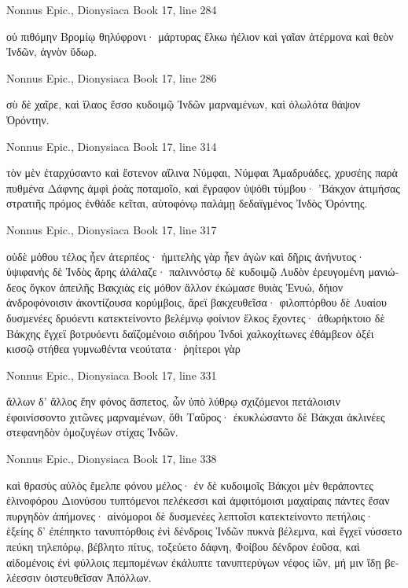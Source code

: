 \documentclass[12pt,letterpaper,twoside,final]{memoir}
\begin{document}
\begin{greek}
Nonnus Epic., Dionysiaca 
Book 17, line 284

οὐ πιθόμην Βρομίῳ θηλύφρονι· μάρτυρας ἕλκω 
ἠέλιον καὶ γαῖαν ἀτέρμονα καὶ θεὸν Ἰνδῶν, 
ἁγνὸν ὕδωρ. 



Nonnus Epic., Dionysiaca 
Book 17, line 286

                σὺ δὲ χαῖρε, καὶ ἵλαος ἔσσο κυδοιμῷ 
Ἰνδῶν μαρναμένων, καὶ ὀλωλότα θάψον Ὀρόντην. 



Nonnus Epic., Dionysiaca 
Book 17, line 314

τὸν μὲν ἐταρχύσαντο καὶ ἔστενον αἴλινα Νύμφαι, 
Νύμφαι Ἁμαδρυάδες, χρυσέης παρὰ πυθμένα Δάφνης 
ἀμφὶ ῥοὰς ποταμοῖο, καὶ ἔγραφον ὑψόθι τύμβου· 
’Βάκχον ἀτιμήσας στρατιῆς πρόμος ἐνθάδε κεῖται, 
αὐτοφόνῳ παλάμῃ δεδαϊγμένος Ἰνδὸς Ὀρόντης. 



Nonnus Epic., Dionysiaca 
Book 17, line 317

οὐδὲ μόθου τέλος ἦεν ἀτερπέος· ἡμιτελὴς γὰρ 
ἦεν ἀγὼν καὶ δῆρις ἀνήνυτος· ὑψιφανὴς δὲ 
Ἰνδὸς ἄρης ἀλάλαζε· παλιννόστῳ δὲ κυδοιμῷ 
Λυδὸν ἐρευγομένη μανιώδεος ὄγκον ἀπειλῆς 
Βακχιὰς εἰς μόθον ἄλλον ἐκώμασε θυιὰς Ἐνυώ, 
δήιον ἀνδροφόνοισιν ἀκοντίζουσα κορύμβοις, 
ἄρεϊ βακχευθεῖσα· φιλοπτόρθου δὲ Λυαίου 
δυσμενέες δρυόεντι κατεκτείνοντο βελέμνῳ 
φοίνιον ἕλκος ἔχοντες· ἀθωρήκτοιο δὲ Βάκχης 
ἔγχεϊ βοτρυόεντι δαϊζομένοιο σιδήρου 
Ἰνδοὶ χαλκοχίτωνες ἐθάμβεον ὀξέι κισσῷ 
στήθεα γυμνωθέντα νεούτατα· ῥηίτεροι γὰρ 




Nonnus Epic., Dionysiaca 
Book 17, line 331

ἄλλων δ' ἄλλος ἔην φόνος ἄσπετος, ὧν ὑπὸ λύθρῳ 
σχιζόμενοι πετάλοισιν ἐφοινίσσοντο χιτῶνες 
μαρναμένων, ὅθι Ταῦρος· ἐκυκλώσαντο δὲ Βάκχαι 
ἀκλινέες στεφανηδὸν ὁμοζυγέων στίχας Ἰνδῶν. 



Nonnus Epic., Dionysiaca 
Book 17, line 338

καὶ θρασὺς αὐλὸς ἔμελπε φόνου μέλος· ἐν δὲ κυδοιμοῖς 
Βάκχοι μὲν θεράποντες ἑλινοφόρου Διονύσου 
τυπτόμενοι πελέκεσσι καὶ ἀμφιτόμοισι μαχαίραις 
πάντες ἔσαν πυργηδὸν ἀπήμονες· αἰνόμοροι δὲ   
δυσμενέες λεπτοῖσι κατεκτείνοντο πετήλοις· 
ἑξείης δ' ἐπέπηκτο τανυπτόρθοις ἐνὶ δένδροις 
Ἰνδῶν πυκνὰ βέλεμνα, καὶ ἔγχεϊ νύσσετο πεύκη 
τηλεπόρῳ, βέβλητο πίτυς, τοξεύετο δάφνη, 
Φοίβου δένδρον ἐοῦσα, καὶ αἰδομένοις ἐνὶ φύλλοις 
πεμπομένων ἐκάλυπτε τανυπτερύγων νέφος ἰῶν, 
μή μιν ἴδῃ βελέεσσιν ὀιστευθεῖσαν Ἀπόλλων. 




\end{greek}
\end{document}
